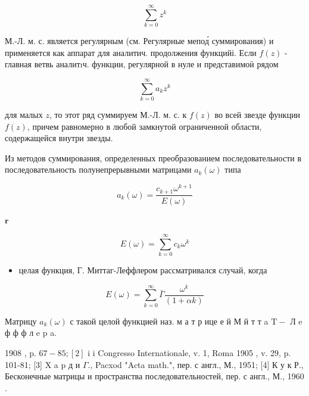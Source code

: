 \documentclass[10pt]{article}
\begin{document}
\[

\sum_{k=0}^{\infty} z^{k}

\]



М.-Л. м. с. является регулярным (см. Регулярные мепод́ суммирования) и применяется как аппарат для аналитич. продолжения функцийі. Если $f(z)$ - главная ветвь аналитıч. функции, регулярной в нуле и представимоӥ рядом



\[

\sum_{k=0}^{\infty} a_{k} z^{k}

\]



для малых $z$, то этот ряд суммируем М.-Л. м. с. к $f(z)$ во всей звезде функции $f(z)$, причем равномерно в любой замкнутой ограниченной области, содержащейся внутри звезды.



Из методов суммирования, определенных преобразованием последовательности в последовательность полунепрерывными матрицами $a_{k}(\omega)$ типа



\[

a_{k}(\omega)=\frac{c_{k+1} \omega^{k+1}}{E(\omega)}

\]



$\mathbf{r}$



\[

E(\omega)=\sum_{k=0}^{\infty} c_{k} \omega^{k}

\]



\begin{itemize}

  \item целая функция, Г. Миттаг-Леффлером рассматривался случай, когда

\end{itemize}



\[

E(\omega)=\sum_{k=0}^{\infty} \bar{\Gamma} \frac{\omega^{k}}{(1+\alpha k)}

\]



Матрицу $a_{k}(\omega)$ с такой целой функцией наз. м а т р ице е й М й т т a $\mathrm{T}-$ Л e ф ф ф л e p a.



1908 , p. $67-85 ;[2]$ i i Congresso Internationale, v. 1, Roma 1905 , v. 29, p. 101-81; [3] X a p д и $\Gamma$., Pacxod "Acta math.", пер. с англ., М., 1951; [4] К у к Р., Бесконечные матрицы и пространства последовательностей, пер. с англ., М., 1960 .
\end{document}

